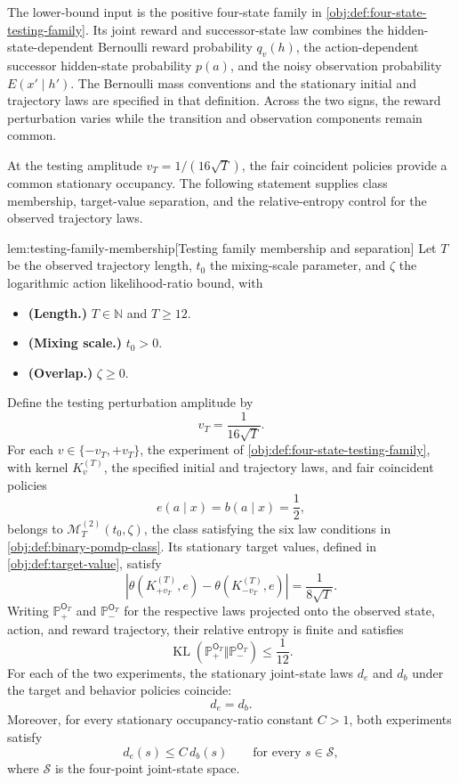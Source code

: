 \documentclass[11pt]{article}
\begin{document}
The lower-bound input is the positive four-state family in \cref{obj:def:four-state-testing-family}. Its joint reward and successor-state law  combines the hidden-state-dependent Bernoulli reward probability \(q_v(h)\), the action-dependent successor hidden-state probability \(p(a)\), and the noisy observation probability \(E(x'\mid h')\). The Bernoulli mass conventions and the stationary initial and trajectory laws are specified in that definition. Across the two signs, the reward perturbation varies while the transition and observation components remain common.

At the testing amplitude \(v_T=1/(16\sqrt T)\), the fair coincident policies provide a common stationary occupancy. The following statement supplies class membership, target-value separation, and the relative-entropy control for the observed trajectory laws.

\begin{lemmav}{lem:testing-family-membership}[Testing family membership and separation]
Let \(T\) be the observed trajectory length, \(t_0\) the mixing-scale parameter, and \(\zeta\) the logarithmic action likelihood-ratio bound, with
\begin{itemize}
\item \textbf{(Length.)} \(T\in\mathbb N\) and \(T\geq12\).
\item \textbf{(Mixing scale.)} \(t_0>0\).
\item \textbf{(Overlap.)} \(\zeta\geq0\).
\end{itemize}
Define the testing perturbation amplitude by
\[
v_T=\frac{1}{16\sqrt T}.
\]
For each \(v\in\{-v_T,+v_T\}\), the experiment of \cref{obj:def:four-state-testing-family}, with kernel \(K_v^{(T)}\), the specified initial and trajectory laws, and fair coincident policies
\[
e(a\mid x)=b(a\mid x)=\frac12,
\]
belongs to \(\mathcal M_T^{(2)}(t_0,\zeta)\), the class satisfying the six law conditions in \cref{obj:def:binary-pomdp-class}. Its stationary target values, defined in \cref{obj:def:target-value}, satisfy
\[
\left|\theta(K_{+v_T}^{(T)},e)-\theta(K_{-v_T}^{(T)},e)\right|
=\frac{1}{8\sqrt T}.
\]
Writing \(\mathbb P_{+}^{\mathsf O_T}\) and \(\mathbb P_{-}^{\mathsf O_T}\) for the respective laws projected onto the observed state, action, and reward trajectory, their relative entropy is finite and satisfies
\[
\operatorname{KL}\!\left(
\mathbb P_{+}^{\mathsf O_T}\Vert\mathbb P_{-}^{\mathsf O_T}
\right)\leq\frac1{12}.
\]
For each of the two experiments, the stationary joint-state laws \(d_e\) and \(d_b\) under the target and behavior policies coincide:
\[
d_e=d_b.
\]
Moreover, for every stationary occupancy-ratio constant \(C>1\), both experiments satisfy
\[
d_e(s)\leq C\,d_b(s)
\qquad\text{for every }s\in\mathcal S,
\]
where \(\mathcal S\) is the four-point joint-state space.
\end{lemmav}
\end{document}
